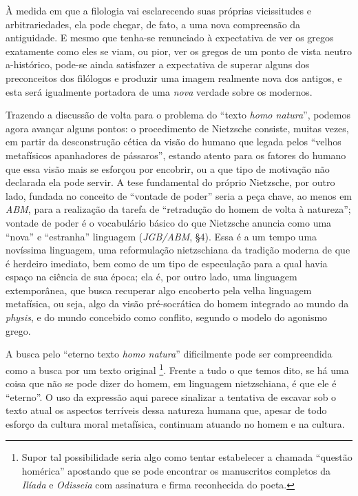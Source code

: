 \documentclass[
	12pt,				%
	openright,			%
	oneside,			%
	a4paper,			%
	english,			%
	french,				%
	spanish,			%
	brazil				%
	]{abntex2}
\begin{document}
	À medida em que a filologia vai esclarecendo suas próprias vicissitudes e arbitrariedades, ela pode chegar, de fato, a uma nova compreensão da antiguidade. E mesmo que tenha-se renunciado à expectativa de ver os gregos exatamente como eles se viam, ou pior, ver os gregos de um ponto de vista neutro a-histórico, pode-se ainda satisfazer a expectativa de superar alguns dos preconceitos dos filólogos e produzir uma imagem realmente nova dos antigos, e esta será igualmente portadora de uma \textit{nova} verdade sobre os modernos.
	
	Trazendo a discussão de volta para o problema do “texto \textit{homo natura}”, podemos agora avançar alguns pontos: o procedimento de Nietzsche consiste, muitas vezes, em partir da desconstrução cética da visão do humano que legada pelos “velhos metafísicos apanhadores de pássaros”, estando atento para os fatores do humano que essa visão mais se esforçou por encobrir, ou a que tipo de motivação não declarada ela pode servir. A tese fundamental do próprio Nietzsche, por outro lado, fundada no conceito de “vontade de poder” seria a peça chave, ao menos em \textit{ABM}, para a realização da tarefa de “retradução do homem de volta à natureza”; vontade de poder é o vocabulário básico do que Nietzsche anuncia como uma “nova” e “estranha” linguagem (\textit{JGB/ABM}, §4). Essa é a um tempo uma novíssima linguagem, uma reformulação nietzschiana da tradição moderna de que é herdeiro imediato, bem como de um tipo de especulação para a qual havia espaço na ciência de sua época; ela é, por outro lado, uma linguagem extemporânea, que busca recuperar algo encoberto pela velha linguagem metafísica, ou seja, algo da visão pré-socrática do homem integrado ao mundo da \textit{physis}, e do mundo concebido como conflito, segundo o modelo do agonismo grego.

A busca pelo “eterno texto \textit{homo natura}” dificilmente pode ser compreendida como a busca por um texto original
\footnote{Supor tal possibilidade seria algo como tentar estabelecer a chamada “questão homérica” apostando que se pode encontrar os manuscritos completos da \textit{Ilíada} e \textit{Odisseia} com assinatura e firma reconhecida do poeta.}. Frente a tudo o que temos dito, se há uma coisa que não se pode dizer do homem, em linguagem nietzschiana, é que ele é “eterno”. O uso da expressão aqui parece sinalizar a tentativa de escavar sob o texto atual os aspectos terríveis dessa natureza humana que, apesar de todo esforço da cultura moral metafísica, continuam atuando no homem e na cultura. 
\end{document}
